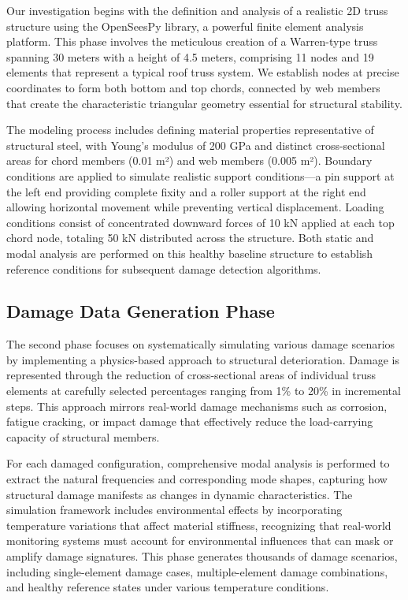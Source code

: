 \documentclass[11pt,a4paper]{article}
\begin{document}
Our investigation begins with the definition and analysis of a realistic 2D truss structure using the OpenSeesPy library, a powerful finite element analysis platform. This phase involves the meticulous creation of a Warren-type truss spanning 30 meters with a height of 4.5 meters, comprising 11 nodes and 19 elements that represent a typical roof truss system. We establish nodes at precise coordinates to form both bottom and top chords, connected by web members that create the characteristic triangular geometry essential for structural stability.

The modeling process includes defining material properties representative of structural steel, with Young's modulus of 200 GPa and distinct cross-sectional areas for chord members (0.01 m²) and web members (0.005 m²). Boundary conditions are applied to simulate realistic support conditions—a pin support at the left end providing complete fixity and a roller support at the right end allowing horizontal movement while preventing vertical displacement. Loading conditions consist of concentrated downward forces of 10 kN applied at each top chord node, totaling 50 kN distributed across the structure. Both static and modal analysis are performed on this healthy baseline structure to establish reference conditions for subsequent damage detection algorithms.

\subsection{Damage Data Generation Phase}

The second phase focuses on systematically simulating various damage scenarios by implementing a physics-based approach to structural deterioration. Damage is represented through the reduction of cross-sectional areas of individual truss elements at carefully selected percentages ranging from 1\% to 20\% in incremental steps. This approach mirrors real-world damage mechanisms such as corrosion, fatigue cracking, or impact damage that effectively reduce the load-carrying capacity of structural members.

For each damaged configuration, comprehensive modal analysis is performed to extract the natural frequencies and corresponding mode shapes, capturing how structural damage manifests as changes in dynamic characteristics. The simulation framework includes environmental effects by incorporating temperature variations that affect material stiffness, recognizing that real-world monitoring systems must account for environmental influences that can mask or amplify damage signatures. This phase generates thousands of damage scenarios, including single-element damage cases, multiple-element damage combinations, and healthy reference states under various temperature conditions.
\end{document}
